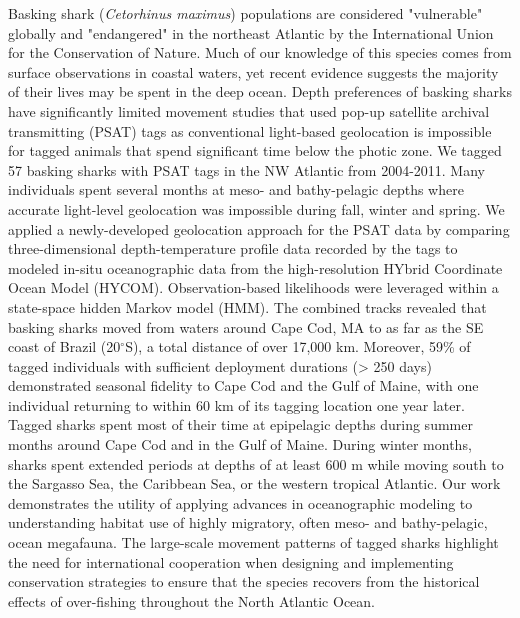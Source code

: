 Basking shark (\textit{Cetorhinus maximus}) populations are considered "vulnerable" globally and "endangered" in the northeast Atlantic by the International Union for the Conservation of Nature. Much of our knowledge of this species comes from surface observations in coastal waters, yet recent evidence suggests the majority of their lives may be spent in the deep ocean. Depth preferences of basking sharks have significantly limited movement studies that used pop-up satellite archival transmitting (PSAT) tags as conventional light-based geolocation is impossible for tagged animals that spend significant time below the photic zone. We tagged 57 basking sharks with PSAT tags in the NW Atlantic from 2004-2011. Many individuals spent several months at meso- and bathy-pelagic depths where accurate light-level geolocation was impossible during fall, winter and spring. We applied a newly-developed geolocation approach for the PSAT data by comparing three-dimensional depth-temperature profile data recorded by the tags to modeled in-situ oceanographic data from the high-resolution HYbrid Coordinate Ocean Model (HYCOM). Observation-based likelihoods were leveraged within a state-space hidden Markov model (HMM). The combined tracks revealed that basking sharks moved from waters around Cape Cod, MA to as far as the SE coast of Brazil (20$^{\circ}$S), a total distance of over 17,000 km. Moreover, 59\% of tagged individuals with sufficient deployment durations (> 250 days) demonstrated seasonal fidelity to Cape Cod and the Gulf of Maine, with one individual returning to within 60 km of its tagging location one year later. Tagged sharks spent most of their time at epipelagic depths during summer months around Cape Cod and in the Gulf of Maine. During winter months, sharks spent extended periods at depths of at least 600 m while moving south to the Sargasso Sea, the Caribbean Sea, or the western tropical Atlantic. Our work demonstrates the utility of applying advances in oceanographic modeling to understanding habitat use of highly migratory, often meso- and bathy-pelagic, ocean megafauna. The large-scale movement patterns of tagged sharks highlight the need for international cooperation when designing and implementing conservation strategies to ensure that the species recovers from the historical effects of over-fishing throughout the North Atlantic Ocean.

